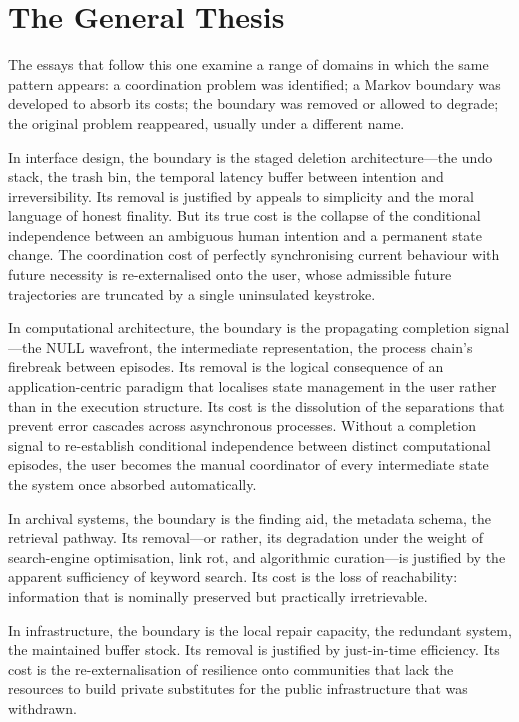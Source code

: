 \documentclass[12pt, a4paper]{article}
\begin{document}
\section{The General Thesis}

The essays that follow this one examine a range of domains in which
the same pattern appears: a coordination problem was identified; a
Markov boundary was developed to absorb its costs; the boundary was
removed or allowed to degrade; the original problem reappeared,
usually under a different name.

In interface design, the boundary is the staged deletion
architecture---the undo stack, the trash bin, the temporal latency
buffer between intention and irreversibility. Its removal is justified
by appeals to simplicity and the moral language of honest finality.
But its true cost is the collapse of the conditional independence
between an ambiguous human intention and a permanent state change.
The coordination cost of perfectly synchronising current behaviour
with future necessity is re-externalised onto the user, whose
admissible future trajectories are truncated by a single uninsulated
keystroke.

In computational architecture, the boundary is the propagating
completion signal---the NULL wavefront, the intermediate
representation, the process chain's firebreak between episodes. Its
removal is the logical consequence of an application-centric paradigm
that localises state management in the user rather than in the
execution structure. Its cost is the dissolution of the separations
that prevent error cascades across asynchronous processes. Without a
completion signal to re-establish conditional independence between
distinct computational episodes, the user becomes the manual
coordinator of every intermediate state the system once absorbed
automatically.

In archival systems, the boundary is the finding aid, the metadata
schema, the retrieval pathway. Its removal---or rather, its
degradation under the weight of search-engine optimisation, link rot,
and algorithmic curation---is justified by the apparent sufficiency
of keyword search. Its cost is the loss of reachability: information
that is nominally preserved but practically irretrievable.

In infrastructure, the boundary is the local repair capacity, the
redundant system, the maintained buffer stock. Its removal is
justified by just-in-time efficiency. Its cost is the
re-externalisation of resilience onto communities that lack the
resources to build private substitutes for the public infrastructure
that was withdrawn.
\end{document}
